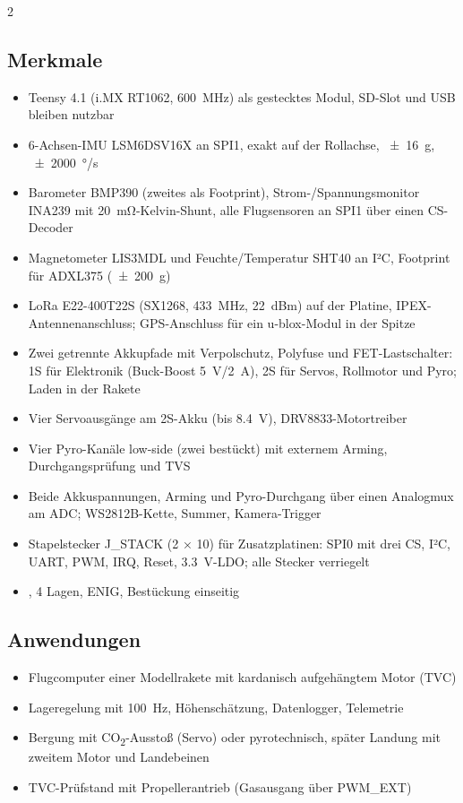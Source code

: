 \documentclass[10pt,a4paper,twoside]{article}
\begin{document}
\vspace{8pt}
\begin{multicols}{2}
\subsection*{Merkmale}
\begin{itemize}
  \item Teensy 4.1 (i.MX RT1062, \SI{600}{MHz}) als gestecktes Modul, SD-Slot und USB bleiben nutzbar
  \item 6-Achsen-IMU LSM6DSV16X an SPI1, exakt auf der Rollachse, \SI{\pm 16}{g}, \SI{\pm 2000}{\degree/s}
  \item Barometer BMP390 (zweites als Footprint), Strom-/Spannungsmonitor INA239 mit \SI{20}{\milli\ohm}-Kelvin-Shunt, alle Flugsensoren an SPI1 über einen CS-Decoder
  \item Magnetometer LIS3MDL und Feuchte/Temperatur SHT40 an I²C, Footprint für ADXL375 (\SI{\pm 200}{g})
  \item LoRa E22-400T22S (SX1268, \SI{433}{MHz}, \SI{22}{dBm}) auf der Platine, IPEX-Antennenanschluss; GPS-Anschluss für ein u-blox-Modul in der Spitze
  \item Zwei getrennte Akkupfade mit Verpolschutz, Polyfuse und FET-Lastschalter: 1S für Elektronik (Buck-Boost \SI{5}{V}/\SI{2}{A}), 2S für Servos, Rollmotor und Pyro; Laden in der Rakete
  \item Vier Servoausgänge am 2S-Akku (bis \SI{8.4}{V}), DRV8833-Motortreiber
  \item Vier Pyro-Kanäle low-side (zwei bestückt) mit externem Arming, Durchgangsprüfung und TVS
  \item Beide Akkuspannungen, Arming und Pyro-Durchgang über einen Analogmux am ADC; WS2812B-Kette, Summer, Kamera-Trigger
  \item Stapelstecker J\_STACK (2 × 10) für Zusatzplatinen: SPI0 mit drei CS, I²C, UART, PWM, IRQ, Reset, \SI{3.3}{V}-LDO; alle Stecker verriegelt
  \item {}, 4 Lagen, ENIG, Bestückung einseitig
\end{itemize}

\subsection*{Anwendungen}
\begin{itemize}
  \item Flugcomputer einer Modellrakete mit kardanisch aufgehängtem Motor (TVC)
  \item Lageregelung mit \SI{100}{Hz}, Höhenschätzung, Datenlogger, Telemetrie
  \item Bergung mit CO\textsubscript{2}-Ausstoß (Servo) oder pyrotechnisch, später Landung mit zweitem Motor und Landebeinen
  \item TVC-Prüfstand mit Propellerantrieb (Gasausgang über PWM\_EXT)
\end{itemize}


\end{multicols}
\end{document}
